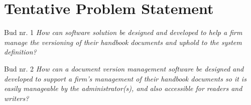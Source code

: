 \section{Tentative Problem Statement} \label{problemstatement}

Bud nr. 1
\textit{How can software solution be designed and developed to help a firm manage the versioning of their handbook documents and  uphold to the system definition?}

Bud nr. 2
\textit{How can a document version management software be designed and developed to support a firm's management of their handbook documents so it is easily manageable by the administrator(s), and also accessible for readers and writers?}
